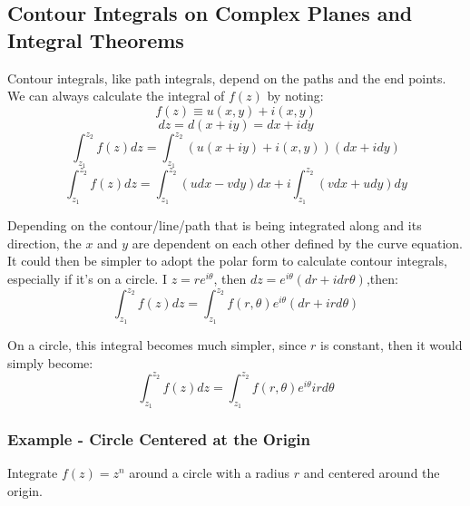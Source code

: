 \documentclass[12pt]{article}
\begin{document}
\subsection{Contour Integrals on Complex Planes and Integral Theorems}
Contour integrals, like path integrals, depend on the paths and the end points. We can always calculate the integral of $f(z)$ by noting:
\begin{equation}
    f(z) \equiv u(x,y) +i(x,y)
\end{equation}
\begin{equation}
   dz = d(x+iy) = dx + idy 
\end{equation}
\begin{equation}
	\int_{z_{1}}^{z_{2}}f(z)dz = \int_{z_{1}}^{z_{2}}(u(x+iy)+i(x,y))(dx+idy)
\end{equation}
\begin{equation}
    \int_{z_{1}}^{z_{2}}f(z)dz=\int_{z_{1}}^{z_{2}}(udx-vdy)dx+i \int_{z_{1}}^{z_{2}}(vdx+udy)dy
\end{equation}

Depending on the contour/line/path that is being integrated along and its direction, the $x$ and $y$ are dependent on each other defined by the curve equation.
It could then be simpler to adopt the polar form to calculate contour integrals, especially if it's on a circle. I $z = re^{i\theta}$, then $dz = e^{i\theta}(dr+idr\theta)$,then:
\begin{equation}
    \int_{z_{1}}^{z_{2}}f(z)dz=\int_{z_{1}}^{z_{2}}f(r,\theta)e^{i\theta}(dr+ird\theta)
\end{equation}

On a circle, this integral becomes much simpler, since $r$ is constant, then it would simply become:
\begin{equation}
    \int_{z_{1}}^{z_{2}}f(z)dz=\int_{z_{1}}^{z_{2}}f(r,\theta)e^{i\theta}ird\theta
\end{equation}

\subsubsection{Example - Circle Centered at the Origin}
Integrate $f(z)=z^{n}$ around a circle with a radius $r$ and centered around the origin. 
\end{document}
